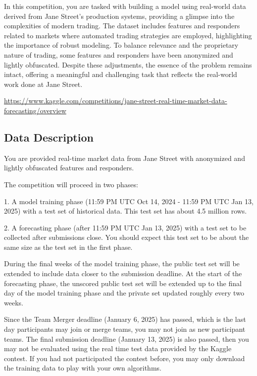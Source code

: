\documentclass[11pt]{article}
\begin{document}
In this competition, you are tasked with building a model using real-world data derived from Jane Street's production systems, providing a glimpse into the complexities of modern trading. The dataset includes features and responders related to markets where automated trading strategies are employed, highlighting the importance of robust modeling. To balance relevance and the proprietary nature of trading, some features and responders have been anonymized and lightly obfuscated. Despite these adjustments, the essence of the problem remains intact, offering a meaningful and challenging task that reflects the real-world work done at Jane Street.


\url{https://www.kaggle.com/competitions/jane-street-real-time-market-data-forecasting/overview}

\subsection{Data Description}
You are provided real-time market data from Jane Street with anonymized and lightly obfuscated features and responders.

The competition will proceed in two phases:

1. A model training phase (11:59 PM UTC Oct 14, 2024 - 11:59 PM UTC Jan 13, 2025) with a test set of historical data. This test set has about 4.5 million rows.

2. A forecasting phase (after 11:59 PM UTC Jan 13, 2025) with a test set to be collected after submissions close. You should expect this test set to be about the same size as the test set in the first phase.


During the final weeks of the model training phase, the public test set will be extended to include data closer to the submission deadline. 
At the start of the forecasting phase, the unscored public test set will be extended up to the final day of the model training phase and the private set updated roughly every two weeks.


Since the Team Merger deadline (January 6, 2025) has passed, which is the last day participants may join or merge teams, you may not join as new participant teams. The final submission deadline (January 13, 2025) is also passed, then you may not be evaluated using the real time test data provided by the Kaggle contest. If you had not participated the contest before, you may only download the training data to play with your own algorithms. 
\end{document}
